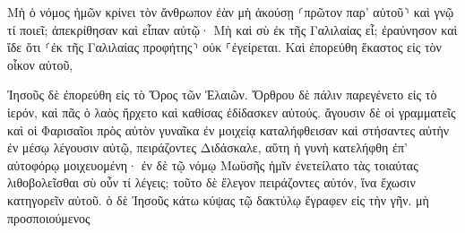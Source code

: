 \documentclass{openreader}
\begin{document}
Μὴ ὁ νόμος ἡμῶν κρίνει τὸν ἄνθρωπον ἐὰν μὴ ἀκούσῃ ⸂πρῶτον παρ’ αὐτοῦ⸃ καὶ γνῷ τί ποιεῖ; 
ἀπεκρίθησαν καὶ εἶπαν αὐτῷ· Μὴ καὶ σὺ ἐκ τῆς Γαλιλαίας εἶ; ἐραύνησον καὶ ἴδε ὅτι ⸂ἐκ τῆς Γαλιλαίας προφήτης⸃ οὐκ ⸀ἐγείρεται. 
Καὶ ἐπορεύθη ἕκαστος εἰς τὸν οἶκον αὐτοῦ, 

Ἰησοῦς δὲ ἐπορεύθη εἰς τὸ Ὄρος τῶν Ἐλαιῶν. 
Ὄρθρου δὲ πάλιν παρεγένετο εἰς τὸ ἱερόν, καὶ πᾶς ὁ λαὸς ἤρχετο καὶ καθίσας ἐδίδασκεν αὐτούς. 
ἄγουσιν δὲ οἱ γραμματεῖς καὶ οἱ Φαρισαῖοι πρὸς αὐτὸν γυναῖκα ἐν μοιχείᾳ καταλήφθεισαν καὶ στήσαντες αὐτὴν ἐν μέσῳ 
λέγουσιν αὐτῷ, πειράζοντες Διδάσκαλε, αὕτη ἡ γυνὴ κατελήφθη ἐπ’ αὐτοφόρῳ μοιχευομένη· 
ἐν δὲ τῷ νόμῳ Μωϋσῆς ἡμῖν ἐνετείλατο τὰς τοιαύτας λιθοβολεῖσθαι σὺ οὖν τί λέγεις; 
τοῦτο δὲ ἔλεγον πειράζοντες αὐτόν, ἵνα ἔχωσιν κατηγορεῖν αὐτοῦ. ὁ δὲ Ἰησοῦς κάτω κύψας τῷ δακτύλῳ ἔγραφεν εἰς τὴν γῆν. μὴ προσποιούμενος 
\end{document}
